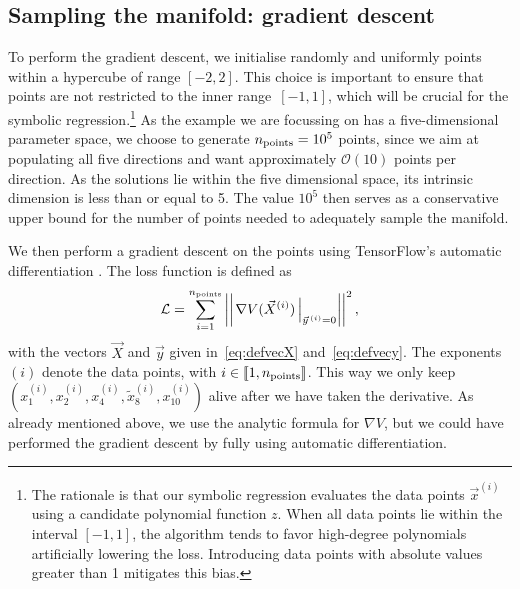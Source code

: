 \documentclass[11pt,a4paper]{article}
\begin{document}
	\subsection{Sampling the manifold: gradient descent} \label{sec:graddes}
	To perform the gradient descent, we initialise randomly and uniformly points within a hypercube of range $[-2,2]$. This choice is important to ensure that points are not restricted to the inner range~$[-1,1]$, which will be crucial for the symbolic regression.\footnote{The rationale is that our symbolic regression evaluates the data points $\vec{x}^{(i)}$ using a candidate polynomial function $z$. When all data points lie within the interval $[-1, 1]$, the algorithm tends to favor high-degree polynomials artificially lowering the loss. Introducing data points with absolute values greater than 1 mitigates this bias.} As the example we are focussing on has a five-dimensional parameter space, we choose to generate $n_{\rm points}=10^5$ points, since we aim at populating all five directions and want approximately $\mathcal{O}(10)$ points per direction. As the solutions lie within the five dimensional space, its intrinsic dimension is less than or equal to 5. The value $10^5$ then serves as a conservative upper bound for the number of points needed to adequately sample the manifold.
	
	We then perform a gradient descent on the points using TensorFlow’s automatic differentiation \cite{tensorflow2015-whitepaper}. The loss function is defined as
	\begin{equation} \label{eq:lossgraddes}
		\mathcal{L} = \sum_{i = 1}^{n_{\rm points}} \left|\left|\left.\nabla V(\vec{X}^{(i)})\,\right|_{\vec{y}^{\,(i)}=0}\right|\right|^2,
	\end{equation}
with the vectors $\vec{X}$ and $\vec{y}$ given in~\eqref{eq:defvecX} and~\eqref{eq:defvecy}. The exponents $(i)$ denote the data points, with $i\in\llbracket1,n_{\rm points}\rrbracket$. This way we only keep $(x^{(i)}_1,x^{(i)}_2,x^{(i)}_4,\tilde{x}^{(i)}_8,x^{(i)}_{10})$ alive after we have taken the derivative. As already mentioned above, we use the analytic formula for $\nabla V$, but we could have performed the gradient descent by fully using automatic differentiation.
\end{document}
